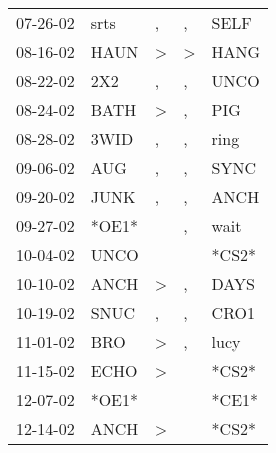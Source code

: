 \begin{supertabular}{p{0.07\textwidth}p{0.06\textwidth}p{0.02\textwidth}p{0.02\textwidth}p{0.06\textwidth}}
 07-26-02\textsuperscript{} &           srts\textsuperscript{} &                , &             , &         SELF\textsuperscript{} \\
 08-16-02\textsuperscript{} &           HAUN\textsuperscript{} &     \textgreater &  \textgreater &         HANG\textsuperscript{} \\
 08-22-02\textsuperscript{} &            2X2\textsuperscript{} &                , &             , &         UNCO\textsuperscript{} \\
 08-24-02\textsuperscript{} &           BATH\textsuperscript{} &     \textgreater &             , &          PIG\textsuperscript{} \\
 08-28-02\textsuperscript{} &           3WID\textsuperscript{} &                , &             , &         ring\textsuperscript{} \\
 09-06-02\textsuperscript{} &            AUG\textsuperscript{} &                , &             , &         SYNC\textsuperscript{} \\
 09-20-02\textsuperscript{} &           JUNK\textsuperscript{} &                , &             , &         ANCH\textsuperscript{} \\
 09-27-02\textsuperscript{} &                            *OE1* &                  &             , &         wait\textsuperscript{} \\
 10-04-02\textsuperscript{} &           UNCO\textsuperscript{} &                  &               &                          *CS2* \\
 10-10-02\textsuperscript{} &           ANCH\textsuperscript{} &     \textgreater &             , &         DAYS\textsuperscript{} \\
 10-19-02\textsuperscript{} &           SNUC\textsuperscript{} &                , &             , &         CRO1\textsuperscript{} \\
 11-01-02\textsuperscript{} &            BRO\textsuperscript{} &     \textgreater &             , &         lucy\textsuperscript{} \\
 11-15-02\textsuperscript{} &           ECHO\textsuperscript{} &     \textgreater &               &                          *CS2* \\
 12-07-02\textsuperscript{} &                            *OE1* &                  &               &                          *CE1* \\
 12-14-02\textsuperscript{} &           ANCH\textsuperscript{} &     \textgreater &               &                          *CS2* \\

\end{supertabular}
